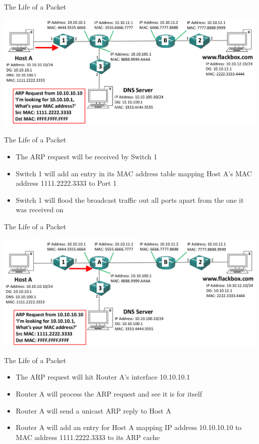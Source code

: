 \documentclass[pdflatex,compress,mathserif]{beamer}
\begin{document}
\begin{frame}{The Life of a Packet}
	\begin{center}
		\includegraphics[width=\linewidth]{img/img17}
	\end{center}
\end{frame}

\begin{frame}{The Life of a Packet}
	\begin{itemize}
		\item The ARP request will be received by Switch 1
		\item Switch 1 will add an entry in its MAC address table mapping Host A’s MAC address 1111.2222.3333 to Port 1
		\item Switch 1 will flood the broadcast traffic out all ports apart from the one it was received on
	\end{itemize}
\end{frame}

\begin{frame}{The Life of a Packet}
	\begin{center}
		\includegraphics[width=\linewidth]{img/img18}
	\end{center}
\end{frame}

\begin{frame}{The Life of a Packet}
	\begin{itemize}
		\item The ARP request will hit Router A’s interface 10.10.10.1
		\item Router A will process the ARP request and see it is for itself
		\item Router A will send a unicast ARP reply to Host A
		\item Router A will add an entry for Host A mapping IP address 10.10.10.10 to MAC address 1111.2222.3333 to its ARP cache
	\end{itemize}
\end{frame}
\end{document}
